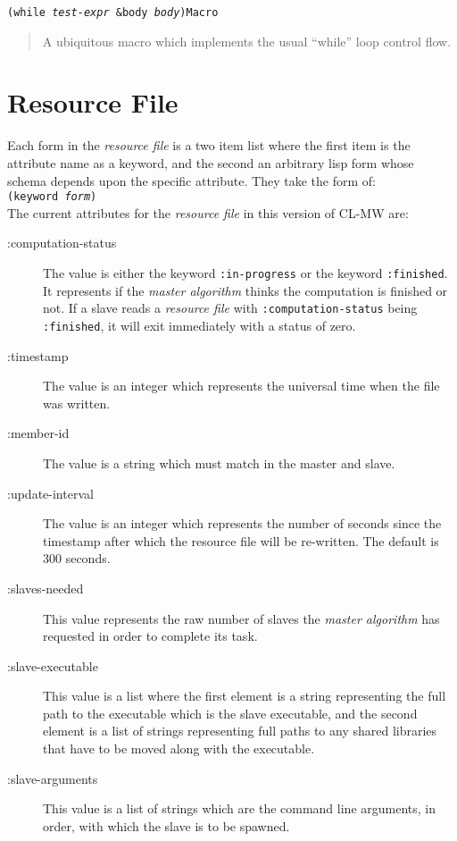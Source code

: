 \documentclass[titlepage,12pt]{book}
\newcommand{\xsmall}{\latexhtml{\small}{}}
\newcommand{\xnormalsize}{\latexhtml{\normalsize}{}}
\newcommand{\clmw}{\xsmall\textsc{CL-MW}\xnormalsize\xspace}
\newcommand{\ma}{\textit{master algorithm}\xspace}
\newcommand{\rfile}{\textit{resource file}\xspace}
\newcommand{\apifunc}[2]{\noindent\xsmall\texttt{(#1)}\hspace*{\fill}\xnormalsize\texttt{#2}}
\newenvironment{apientry}[2]
	{\apifunc{#1}{#2}\begin{quotation}}
	{\end{quotation}}
\begin{document}
\begin{apientry}
{while \emph{test-expr} \&body \emph{body}}
{Macro}
A ubiquitous macro which implements the usual ``while'' loop control flow.
\end{apientry}

\section{Resource File}
\label{resource-file}

Each form in the \rfile is a two item list where the first item
is the attribute name as a keyword, and the second an arbitrary lisp
form whose schema depends upon the specific attribute. They take the
form of:\\

\noindent\texttt{(keyword \textit{form})}\\

The current attributes for the \rfile in this version of \clmw are:

\begin{description}
\item[:computation-status] 
	The value is either the keyword \texttt{:in-progress} or the
	keyword \texttt{:finished}. It represents if the \ma thinks
	the computation is finished or not. If a slave reads a \rfile
	with \texttt{:computation-status} being \texttt{:finished},
	it will exit immediately with a status of zero.

\item[:timestamp] 
	The value is an integer which represents the universal time when the file
	was written.

\item[:member-id] 
	The value is a string which must match in the master and slave.

\item[:update-interval]
	The value is an integer which represents the number of seconds since the
	timestamp after which the resource file will be re-written. The default 
	is 300 seconds.

\item[:slaves-needed]
	This value represents the raw number of slaves the \ma has requested in
	order to complete its task.

\item[:slave-executable]
	This value is a list where the first element is a string
	representing the full path to the executable which is the
	slave executable, and the second element is a list of strings
	representing full paths to any shared libraries that have to
	be moved along with the executable.

\item[:slave-arguments]
	This value is a list of strings which are the command line arguments,
	in order, with which the slave is to be spawned.
\end{description}
\end{document}
